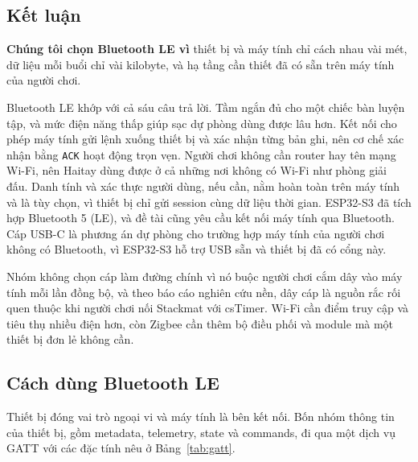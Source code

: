 \subsection{Kết luận}
\begin{tcolorbox}[
    colback=haitayblue!8,
    colframe=haitayblue,
    arc=4pt,
    boxrule=0.8pt
]
    \textbf{Chúng tôi chọn Bluetooth LE vì} thiết bị và máy tính chỉ cách nhau vài mét, dữ liệu mỗi buổi chỉ vài kilobyte, và hạ tầng cần thiết đã có sẵn trên máy tính của người chơi.
\end{tcolorbox}

Bluetooth LE khớp với cả sáu câu trả lời. Tầm ngắn đủ cho một chiếc bàn luyện tập, và mức điện năng thấp giúp sạc dự phòng dùng được lâu hơn. Kết nối cho phép máy tính gửi lệnh xuống thiết bị và xác nhận từng bản ghi, nên cơ chế xác nhận bằng \texttt{ACK} hoạt động trọn vẹn. Người chơi không cần router hay tên mạng Wi-Fi, nên Haitay dùng được ở cả những nơi không có Wi-Fi như phòng giải đấu. Danh tính và xác thực người dùng, nếu cần, nằm hoàn toàn trên máy tính và là tùy chọn, vì thiết bị chỉ gửi session cùng dữ liệu thời gian. ESP32-S3 đã tích hợp Bluetooth 5 (LE), và đề tài cũng yêu cầu kết nối máy tính qua Bluetooth. Cáp USB-C là phương án dự phòng cho trường hợp máy tính của người chơi không có Bluetooth, vì ESP32-S3 hỗ trợ USB sẵn và thiết bị đã có cổng này.

Nhóm không chọn cáp làm đường chính vì nó buộc người chơi cắm dây vào máy tính mỗi lần đồng bộ, và theo báo cáo nghiên cứu nền, dây cáp là nguồn rắc rối quen thuộc khi người chơi nối Stackmat với csTimer. Wi-Fi cần điểm truy cập và tiêu thụ nhiều điện hơn, còn Zigbee cần thêm bộ điều phối và module mà một thiết bị đơn lẻ không cần.

\subsection{Cách dùng Bluetooth LE}
Thiết bị đóng vai trò ngoại vi và máy tính là bên kết nối. Bốn nhóm thông tin của thiết bị, gồm metadata, telemetry, state và commands, đi qua một dịch vụ GATT với các đặc tính nêu ở Bảng~\ref{tab:gatt}.

